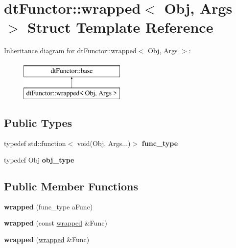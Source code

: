 \hypertarget{structdt_functor_1_1wrapped}{}\section{dt\+Functor\+:\+:wrapped$<$ Obj, Args $>$ Struct Template Reference}
\label{structdt_functor_1_1wrapped}
Inheritance diagram for dt\+Functor\+:\+:wrapped$<$ Obj, Args $>$\+:\begin{figure}[H]
\begin{center}
\leavevmode
\includegraphics[height=2.000000cm]{d0/d5d/structdt_functor_1_1wrapped}
\end{center}
\end{figure}
\subsection*{Public Types}
\begin{DoxyCompactItemize}
\item 
\mbox{\label{structdt_functor_1_1wrapped_a6733d1533cce3316598b1af1b91c22b3}} 
typedef std\+::function$<$ void(Obj, Args...)$>$ {\bfseries func\+\_\+type}
\item 
\mbox{\label{structdt_functor_1_1wrapped_ab5cf20535fe68fb49a1f19999dfbf47b}} 
typedef Obj {\bfseries obj\+\_\+type}
\end{DoxyCompactItemize}
\subsection*{Public Member Functions}
\begin{DoxyCompactItemize}
\item 
\mbox{\label{structdt_functor_1_1wrapped_ac2fbb0b37b7d4e047e4648e92515c01c}} 
{\bfseries wrapped} (func\+\_\+type a\+Func)
\item 
\mbox{\label{structdt_functor_1_1wrapped_af99773a4098876ba57aeb431ee9410b5}} 
{\bfseries wrapped} (const \hyperlink{structdt_functor_1_1wrapped}{wrapped} \&Func)
\item 
\mbox{\label{structdt_functor_1_1wrapped_a643244706e36ae47fd4a4a9496363591}} 
{\bfseries wrapped} (\hyperlink{structdt_functor_1_1wrapped}{wrapped} \&Func)
\end{DoxyCompactItemize}
